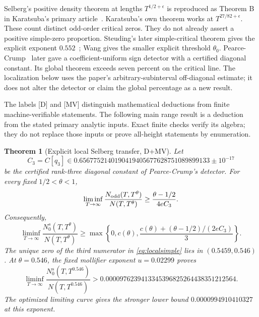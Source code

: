 \documentclass[11pt]{article}
\newtheorem{theorem}{Theorem}[section]
\theoremstyle{remark}
\begin{document}
Selberg's positive density theorem at lengths $T^{1/2+\epsilon}$ is
reproduced as Theorem B in Karatsuba's primary article~\cite{Karatsuba}.
Karatsuba's own theorem works at $T^{27/82+\epsilon}$. These count distinct
odd-order critical zeros. They do not already assert a positive simple-zero
proportion. Steuding's later simple-critical theorem gives the explicit
exponent $0.552$~\cite{Steuding,SteudingThesis}; Wang gives the smaller
explicit threshold $\theta_0$. Pearce-Crump~\cite{PearceCrump} later gave a
coefficient-uniform sign detector with a certified diagonal constant. Its
global theorem exceeds seven percent on the critical line. The localization
below uses the paper's arbitrary-subinterval off-diagonal estimate; it does
not alter the detector or claim the global percentage as a new result.

The labels [D] and [MV] distinguish mathematical deductions from finite
machine-verifiable statements. The following main range result is a
deduction from the stated primary analytic inputs. Exact finite checks
verify its algebra; they do not replace those inputs or prove all-height
statements by enumeration.

\begin{theorem}[Explicit local Selberg transfer, D+MV]
\label{thm:localselberg}
Let
\[
C_3=C[q_3]\in
0.6567752140190419405677628751089899133\pm10^{-17}
\]
be the certified rank-three diagonal constant of Pearce-Crump's detector.
For every fixed $1/2<\theta<1$,
\begin{equation}\label{eq:localodd}
 \liminf_{T\to\infty}
 \frac{N_{\rm odd}(T,T^\theta)}{N(T,T^\theta)}
 \ge\frac{\theta-1/2}{4eC_3}.
\end{equation}
Consequently,
\begin{equation}\label{eq:localsimple}
 \liminf_{T\to\infty}
 \frac{N_0^s(T,T^\theta)}{N(T,T^\theta)}
 \ge\max\left\{0,c(\theta),
 \frac{c(\theta)+(\theta-1/2)/(2eC_3)}3\right\}.
\end{equation}
The unique zero of the third numerator in \eqref{eq:localsimple} lies in
$(0.5459,0.546)$. At $\theta=0.546$, the fixed mollifier exponent
$u=0.02299$ proves
\begin{equation}\label{eq:localpoint}
 \liminf_{T\to\infty}
 \frac{N_0^s(T,T^{0.546})}{N(T,T^{0.546})}
 >0.0000976239413345396825264438351212564.
\end{equation}
The optimized limiting curve gives the stronger lower bound
$0.0000994910410327$ at this exponent.
\end{theorem}
\end{document}
